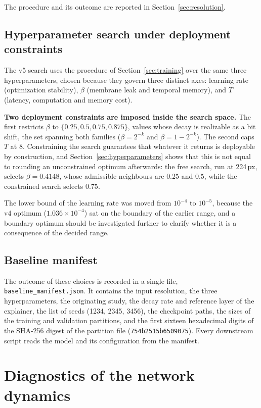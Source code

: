 The procedure and its outcome are reported in Section~\ref{sec:resolution}.
 
\subsection{Hyperparameter search under deployment constraints}
\label{sec:constrained-search}
 
The v5 search uses the procedure of Section~\ref{sec:training} over the same three
hyperparameters, chosen because they govern three distinct axes: learning rate
(optimization stability), $\beta$ (membrane leak and temporal memory), and $T$
(latency, computation and memory cost).
 
\textbf{Two deployment constraints are imposed inside the search space.} The
first restricts $\beta$ to $\{0.25, 0.5, 0.75, 0.875\}$, values whose decay is
realizable as a bit shift, the set spanning both families ($\beta = 2^{-k}$ and
$\beta = 1 - 2^{-k}$). The second caps $T$ at 8. Constraining the search guarantees that whatever it returns is deployable by
construction, and Section~\ref{sec:hyperparameters} shows that this is not equal
to rounding an unconstrained optimum afterwards: the free search, run at
224\,px, selects $\beta = 0.4148$, whose admissible neighbours are $0.25$ and
$0.5$, while the constrained search selects $0.75$.
 
The lower bound of the learning rate was moved from $10^{-4}$ to $10^{-5}$,
because the v4 optimum ($1.036 \times 10^{-4}$) sat on the boundary of the
earlier range, and a boundary optimum should be investigated further to clarify whether it is
a consequence of the decided range.
 
\subsection{Baseline manifest}
 
The outcome of these choices is recorded in a single file,
\texttt{baseline\_manifest.json}. It contains the input resolution, the three
hyperparameters, the originating study, the decay rate and reference layer of
the explainer, the list of seeds (1234, 2345, 3456), the checkpoint paths, the
sizes of the training and validation partitions, and the first sixteen
hexadecimal digits of the SHA-256 digest of the partition file
(\texttt{754b2515b6509075}).
Every downstream script reads the model and its configuration from the manifest.

 
\section{Diagnostics of the network dynamics}
\label{sec:diagnostics}
 
